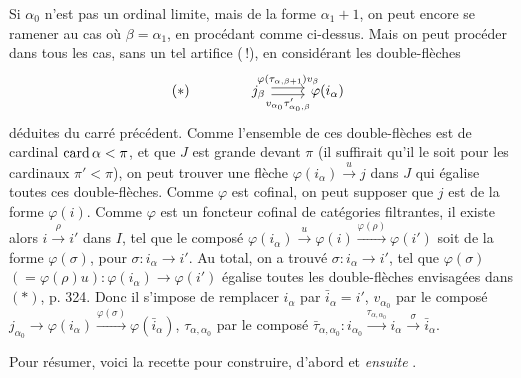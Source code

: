 Si $\alpha_0$ n'est pas un ordinal limite, mais de la forme $\alpha_1+1$, on peut encore se ramener au cas où $\beta=\alpha_1$, en procédant comme ci-dessus. Mais on peut procéder dans tous les cas, sans un tel artifice (\,!), en considérant les double-flèches
\[
(*)\qquad\qquad
\begin{tikzcd}
j_\beta \arrow[r, shift left, "\varphi(\tau_{\alpha,\beta+1})v_\beta"] \arrow[r, shift right, "v_{\alpha_0}\tau'_{\alpha_0,\beta}"'] & \varphi(i_\alpha)
\end{tikzcd}
\]
déduites du carré précédent. Comme
l'ensemble de ces double-flèches est de cardinal $\operatorname{card}\alpha<\pi$, et que $J$ est grande devant $\pi$ (il suffirait qu'il le soit pour les cardinaux $\pi'<\pi$), on peut trouver une flèche $\varphi(i_\alpha)\xrightarrow{u}j$ dans $J$ qui égalise toutes ces double-flèches. Comme $\varphi$ est cofinal, on peut supposer que $j$ est de la forme $\varphi(i)$. Comme $\varphi$ est un foncteur cofinal de catégories filtrantes, il existe alors $i\xrightarrow{\rho}i'$ dans $I$, tel que le composé $\varphi(i_\alpha)\xrightarrow{u}\varphi(i)\xrightarrow{\varphi(\rho)}\varphi(i')$ soit de la forme $\varphi(\sigma)$, pour $\sigma:i_\alpha\longrightarrow i'$. Au total, on a trouvé $\sigma:i_\alpha\longrightarrow i'$, tel que $\varphi(\sigma)$ $(=\varphi(\rho)u):\varphi(i_\alpha)\longrightarrow\varphi(i')$ égalise toutes les double-flèches envisagées dans $(*)$, p. 324. Donc il s'impose de remplacer $i_\alpha$ par $\bar{i}_\alpha=i'$, $v_{\alpha_0}$ par le composé $j_{\alpha_0}\longrightarrow\varphi(i_\alpha)\xrightarrow{\varphi(\sigma)}\varphi(\bar{i}_\alpha)$, $\tau_{\alpha,\alpha_0}$
par le composé $\bar{\tau}_{\alpha,\alpha_0}:i_{\alpha_0}\xrightarrow{\tau_{\alpha,\alpha_0}}i_\alpha\xrightarrow{\sigma}\bar{i}_\alpha$.

Pour résumer, voici la recette pour construire, d'abord  et \textit{ensuite} .

